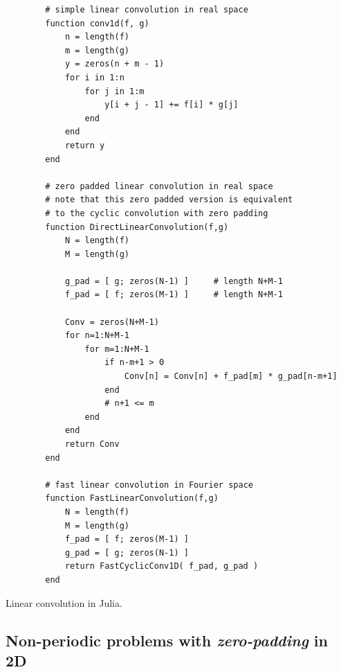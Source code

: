 \begin{codebox}[!htb]
    \begin{verbatim}
        # simple linear convolution in real space
        function conv1d(f, g)
            n = length(f)
            m = length(g)
            y = zeros(n + m - 1)
            for i in 1:n
                for j in 1:m
                    y[i + j - 1] += f[i] * g[j]
                end
            end
            return y
        end

        # zero padded linear convolution in real space
        # note that this zero padded version is equivalent
        # to the cyclic convolution with zero padding
        function DirectLinearConvolution(f,g)
            N = length(f)
            M = length(g)

            g_pad = [ g; zeros(N-1) ]     # length N+M-1
            f_pad = [ f; zeros(M-1) ]     # length N+M-1

            Conv = zeros(N+M-1)
            for n=1:N+M-1
                for m=1:N+M-1
                    if n-m+1 > 0
                        Conv[n] = Conv[n] + f_pad[m] * g_pad[n-m+1]
                    end
                    # n+1 <= m
                end
            end
            return Conv
        end

        # fast linear convolution in Fourier space
        function FastLinearConvolution(f,g)
            N = length(f)
            M = length(g)
            f_pad = [ f; zeros(M-1) ]     
            g_pad = [ g; zeros(N-1) ]     
            return FastCyclicConv1D( f_pad, g_pad )
        end
    \end{verbatim}
    \caption{Linear convolution in Julia.}
    \label{code:linear_convolution}
\end{codebox}

\subsection{Non-periodic problems with \textit{zero-padding} in 2D}

